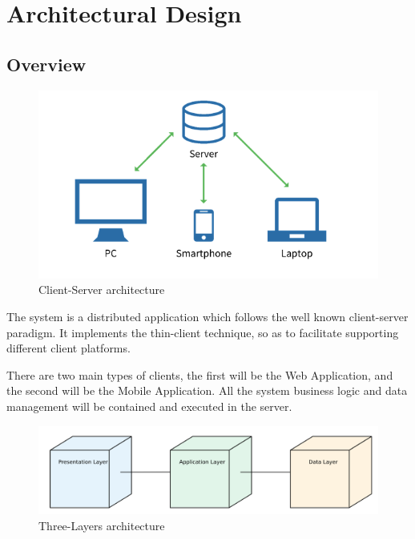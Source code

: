 \documentclass{article}
\begin{document}
    
\newpage





\section{Architectural Design}

\subsection{Overview}

    \begin{figure} [h]
        \centering
        \includegraphics[width=1\textwidth]{images/ArchitecturalDesign/ClientServerModel.png}
        \caption{\label{fig:ClientServer}Client-Server architecture}
    \end{figure}
    
    The system is a distributed application which follows the well known client-server paradigm. It implements the thin-client technique, so as to facilitate supporting different client platforms. \par
    
    There are two main types of clients, the first will be the Web Application, and the second will be the Mobile Application. All the system business logic and data management will be contained and executed in the server.

    \begin{figure} [h]
        \centering
        \includegraphics[width=1\textwidth]{images/ArchitecturalDesign/ThreeLayers.png}
        \caption{\label{fig:ThreeLayers}Three-Layers architecture}
    \end{figure}
    
\end{document}
